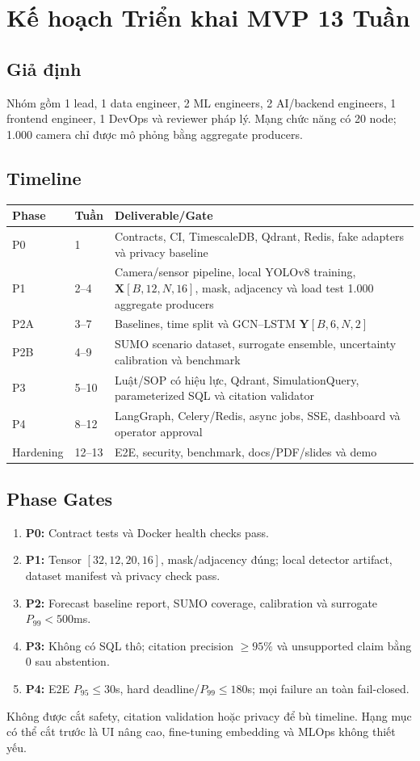 \chapter{Kế hoạch Triển khai MVP 13 Tuần}

\section{Giả định}

Nhóm gồm 1 lead, 1 data engineer, 2 ML engineers, 2 AI/backend engineers, 1 frontend engineer, 1 DevOps và reviewer pháp lý. Mạng chức năng có 20 node; 1.000 camera chỉ được mô phỏng bằng aggregate producers.

\section{Timeline}

\begin{longtable}{p{2cm} p{3cm} p{8cm}}
\toprule
\textbf{Phase} & \textbf{Tuần} & \textbf{Deliverable/Gate} \\
\midrule
P0 & 1 & Contracts, CI, TimescaleDB, Qdrant, Redis, fake adapters và privacy baseline \\
P1 & 2--4 & Camera/sensor pipeline, local YOLOv8 training, $\mathbf{X}[B,12,N,16]$, mask, adjacency và load test 1.000 aggregate producers \\
P2A & 3--7 & Baselines, time split và GCN--LSTM $\mathbf{Y}[B,6,N,2]$ \\
P2B & 4--9 & SUMO scenario dataset, surrogate ensemble, uncertainty calibration và benchmark \\
P3 & 5--10 & Luật/SOP có hiệu lực, Qdrant, SimulationQuery, parameterized SQL và citation validator \\
P4 & 8--12 & LangGraph, Celery/Redis, async jobs, SSE, dashboard và operator approval \\
Hardening & 12--13 & E2E, security, benchmark, docs/PDF/slides và demo \\
\bottomrule
\end{longtable}

\section{Phase Gates}

\begin{enumerate}
  \item \textbf{P0:} Contract tests và Docker health checks pass.
  \item \textbf{P1:} Tensor $[32,12,20,16]$, mask/adjacency đúng; local detector artifact, dataset manifest và privacy check pass.
  \item \textbf{P2:} Forecast baseline report, SUMO coverage, calibration và surrogate $P_{99}<500$ms.
  \item \textbf{P3:} Không có SQL thô; citation precision $\geq95\%$ và unsupported claim bằng 0 sau abstention.
  \item \textbf{P4:} E2E $P_{95}\leq30$s, hard deadline/$P_{99}\leq180$s; mọi failure an toàn fail-closed.
\end{enumerate}

Không được cắt safety, citation validation hoặc privacy để bù timeline. Hạng mục có thể cắt trước là UI nâng cao, fine-tuning embedding và MLOps không thiết yếu.
